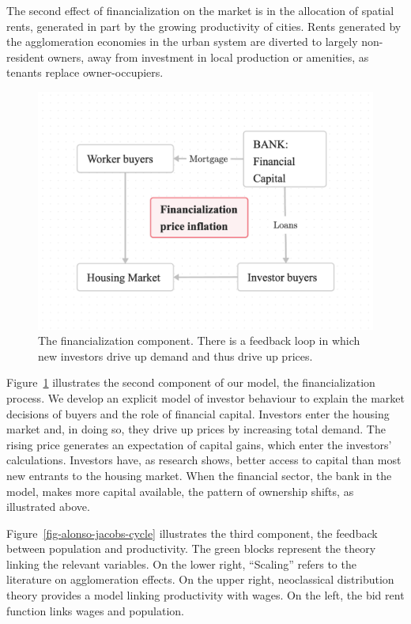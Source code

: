 The second effect of financialization on the market is in the allocation of \glspl{spatial rent}, generated in part by the growing productivity of cities. Rents generated by the \gls{agglomeration} economies in the urban system are diverted to largely non-resident owners, away from investment in local production or amenities, as tenants replace owner-occupiers.

\begin{figure}[!ht]
\centering
\includegraphics[scale=.20]{fig/flow-financialization.png}
\caption[The financialization component of the model]{The financialization component. There is a feedback loop in which new investors drive up demand and thus drive up prices.}
\label{fig-financial-cycle}
\end{figure}

Figure~\ref{fig-financial-cycle} illustrates the second component of our model, the financialization process. We develop an explicit model of investor behaviour to explain the market decisions of buyers and the role of financial capital. %
Investors enter the housing market and, in doing so, they drive up prices by increasing total demand. The rising price generates an expectation of capital gains, which enter the investors' calculations. Investors have, as research shows, better access to capital than most new entrants to the housing market. When the financial sector, the bank in the model, makes more capital available, the pattern of ownership shifts, as illustrated above.

Figure~\ref{fig-alonso-jacobs-cycle} illustrates the third component, the feedback between population and productivity. The green blocks represent the theory linking the relevant variables.  On the lower right, ``Scaling'' refers to the literature on agglomeration effects. On the upper right, neoclassical distribution theory provides a model linking productivity with wages.  On the left, the bid rent function links wages and population.


